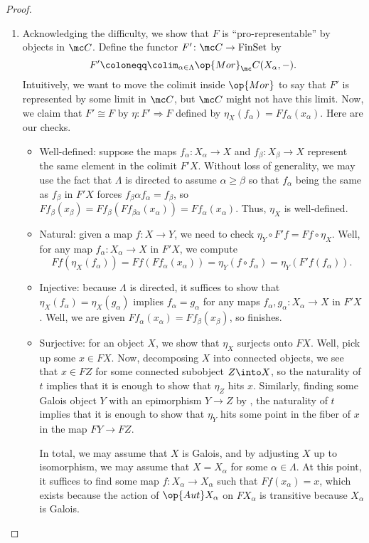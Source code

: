 \documentclass{amsart}
\begin{document}
\begin{proof}
\begin{enumerate}
        \item Acknowledging the difficulty, we show that $F$ is ``pro-representable'' by objects in $\mc C$. Define the functor $F'\colon\mc C\to\mathrm{FinSet}$ by
        \[F'\coloneqq\colim_{\alpha\in\Lambda}\op{Mor}_\mc C(X_\alpha,-).\]
        Intuitively, we want to move the colimit inside $\op{Mor}$ to say that $F'$ is represented by some limit in $\mc C$, but $\mc C$ might not have this limit. Now, we claim that $F'\cong F$ by $\eta\colon F'\Rightarrow F$ defined by $\eta_X(f_\alpha)=Ff_\alpha(x_\alpha)$. Here are our checks.
        \begin{itemize}
            \item Well-defined: suppose the maps $f_\alpha\colon X_\alpha\to X$ and $f_\beta\colon X_\beta\to X$ represent the same element in the colimit $F'X$. Without loss of generality, we may use the fact that $\Lambda$ is directed to assume $\alpha\ge\beta$ so that $f_\alpha$ being the same as $f_\beta$ in $F'X$ forces $f_\beta\alpha f_\alpha=f_\beta$, so $Ff_\beta(x_\beta)=Ff_\beta(Ff_{\beta\alpha}(x_\alpha))=Ff_\alpha(x_\alpha)$. Thus, $\eta_X$ is well-defined.
            \item Natural: given a map $f\colon X\to Y$, we need to check $\eta_Y\circ F'f=Ff\circ\eta_X$. Well, for any map $f_\alpha\colon X_\alpha\to X$ in $F'X$, we compute
            \[Ff(\eta_X(f_\alpha))=Ff(Ff_\alpha(x_\alpha))=\eta_Y(f\circ f_\alpha)=\eta_Y(F'f(f_\alpha)).\]
            \item Injective: because $\Lambda$ is directed, it suffices to show that $\eta_X(f_\alpha)=\eta_X(g_\alpha)$ implies $f_\alpha=g_\alpha$ for any maps $f_\alpha,g_\alpha\colon X_\alpha\to X$ in $F'X$. Well, we are given $Ff_\alpha(x_\alpha)=Ff_\beta(x_\beta)$, so  finishes.
            \item Surjective: for an object $X$, we show that $\eta_X$ surjects onto $FX$. Well, pick up some $x\in FX$. Now, decomposing $X$ into connected objects, we see that $x\in FZ$ for some connected subobject $Z\into X$, so the naturality of $t$ implies that it is enough to show that $\eta_Z$ hits $x$. Similarly, finding some Galois object $Y$ with an epimorphism $Y\to Z$ by , the naturality of $t$ implies that it is enough to show that $\eta_Y$ hits some point in the fiber of $x$ in the map $FY\to FZ$.

            In total, we may assume that $X$ is Galois, and by adjusting $X$ up to isomorphism, we may assume that $X=X_\alpha$ for some $\alpha\in\Lambda$. At this point, it suffices to find some map $f\colon X_\alpha\to X_\alpha$ such that $Ff(x_\alpha)=x$, which exists because the action of $\op{Aut}X_\alpha$ on $FX_\alpha$ is transitive because $X_\alpha$ is Galois.
        \end{itemize}


\end{enumerate}
\end{proof}
\end{document}
